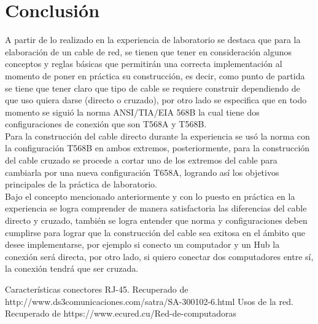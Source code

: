 \documentclass[spanish]{udpreport}
\begin{document}
\chapter{Conclusión}
A partir de lo realizado en la experiencia de laboratorio se destaca que para la elaboración de un cable de  red, se tienen que tener en consideración algunos conceptos  y reglas básicas que permitirán una correcta implementación al momento de poner en práctica su construcción, es decir, como punto de partida se tiene que tener claro que tipo de cable se requiere construir dependiendo de que uso quiera darse (directo o cruzado), por otro lado se especifica que en todo momento se siguió la norma ANSI/TIA/EIA 568B la cual tiene dos configuraciones de conexión que son T568A y T568B.\\
Para la construcción del cable directo durante la experiencia se usó la norma con la configuración T568B en ambos extremos, posteriormente, para la construcción del cable cruzado se procede a cortar uno de los extremos del cable para cambiarla por una nueva configuración T658A, logrando así los objetivos principales de la práctica de laboratorio.\\
Bajo el concepto mencionado anteriormente y con lo puesto en práctica en la experiencia se logra comprender de manera satisfactoria las diferencias del cable directo y cruzado, también se logra entender que norma y configuraciones deben cumplirse para lograr que la construcción del cable sea exitosa en el ámbito que desee implementarse, por ejemplo si conecto un computador y un Hub la conexión será directa, por otro lado, si quiero conectar dos computadores entre sí, la conexión tendrá que ser cruzada.
\begin{thebibliography}{0}
Características conectores RJ-45. Recuperado de http://www.ds3comunicaciones.com/satra/SA-300102-6.html
Usos de la red. Recuperado de https://www.ecured.cu/Red-de-computadoras

\end{thebibliography}
\listoffigures
\end{document}
